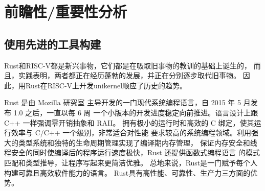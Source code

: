 \documentclass{../runikraft-report}
\begin{document}

\section{前瞻性/重要性分析}

\subsection{使用先进的工具构建}

Rust和RISC-V都是新兴事物，它们都是在吸取旧事物的教训的基础上诞生的，
而且，实践表明，两者都正在经历蓬勃的发展，并正在分别逐步取代旧事物。
因此，用Rust在RISC-V上开发unikernel顺应了历史的趋势。

Rust 是由 Mozilla 研究室
主导开发的一门现代系统编程语言，自 2015 年 5 月发布 1.0 之后，一直以每 6 周
一个小版本的开发进度稳定向前推进。语言设计上跟 C++ 一样强调零开销抽象和 RAII。
拥有极小的运行时和高效的 C 绑定，使其运行效率与 C/C++ 一个级别，非常适合对性能
要求较高的系统编程领域。利用强大的类型系统和独特的生命周期管理实现了编译期内存管理，
保证内存安全和线程安全的同时使编译后的程序运行速度极快，Rust 还提供函数式编程语言
的模式匹配和类型推导，让程序写起来更简洁优雅。\cite{bib:2-why-rust}
总地来说，Rust是一门赋予每个人 构建可靠且高效软件能力的语言。\cite{bib:1-rust-lang}
Rust具有高性能、可靠性、生产力三方面的优势。
\end{document}
